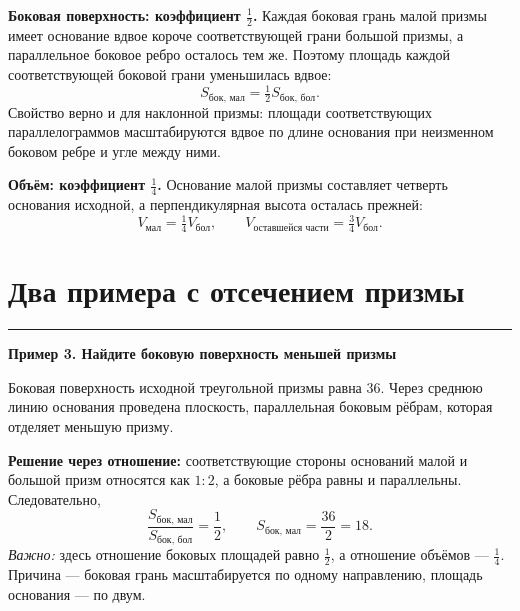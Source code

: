 \documentclass[a4paper,12pt]{article}
\newcommand{\topic}[1]{\needspace{6\baselineskip}\section{#1}\vspace{-1.5mm}\noindent\textcolor{accent}{\rule{\linewidth}{0.45pt}}\vspace{-2mm}}
\newcommand{\ex}[1]{\par\medskip\noindent\textcolor{darkaccent}{\textbf{#1}}\par\smallskip}
\begin{document}
\begin{center}
\end{center}
\vspace{-2mm}
\textbf{Боковая поверхность: коэффициент $\frac12$.} Каждая боковая грань малой призмы имеет основание вдвое короче соответствующей грани большой призмы, а параллельное боковое ребро осталось тем же. Поэтому площадь каждой соответствующей боковой грани уменьшилась вдвое:
\[
\boxed{S_{\text{бок, мал}}=\tfrac12 S_{\text{бок, бол}}}.
\]
Свойство верно и для наклонной призмы: площади соответствующих параллелограммов масштабируются вдвое по длине основания при неизменном боковом ребре и угле между ними.

\textbf{Объём: коэффициент $\frac14$.} Основание малой призмы составляет четверть основания исходной, а перпендикулярная высота осталась прежней:
\[
\boxed{V_{\text{мал}}=\tfrac14 V_{\text{бол}}},\qquad
\boxed{V_{\text{оставшейся части}}=\tfrac34V_{\text{бол}}}.
\]

\clearpage
\topic{Два примера с отсечением призмы}
\ex{Пример 3. Найдите боковую поверхность меньшей призмы}
Боковая поверхность исходной треугольной призмы равна $36$. Через среднюю линию основания проведена плоскость, параллельная боковым рёбрам, которая отделяет меньшую призму.

\textbf{Решение через отношение:} соответствующие стороны оснований малой и большой призм относятся как $1:2$, а боковые рёбра равны и параллельны. Следовательно,
\[
\frac{S_{\text{бок, мал}}}{S_{\text{бок, бол}}}=\frac12,
\qquad S_{\text{бок, мал}}=\frac{36}{2}=\boxed{18}.
\]
\emph{Важно:} здесь отношение боковых площадей равно $\frac12$, а отношение объёмов --- $\frac14$. Причина --- боковая грань масштабируется по одному направлению, площадь основания --- по двум.
\end{document}
